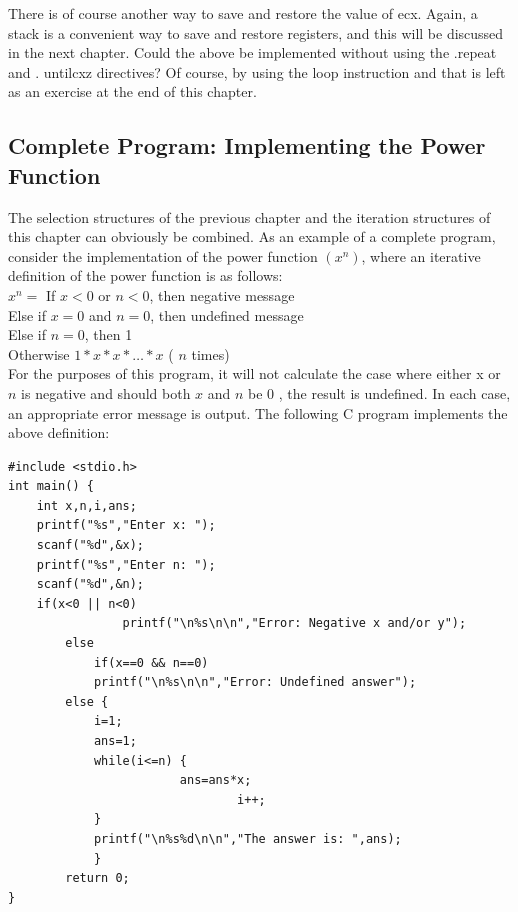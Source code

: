 \documentclass[10pt]{book}
\begin{document}
There is of course another way to save and restore the value of ecx. Again, a stack is a convenient way to save and restore registers, and this will be discussed in the next chapter. Could the above be implemented without using the .repeat and . untilcxz directives? Of course, by using the loop instruction and that is left as an exercise at the end of this chapter.

\subsection{Complete Program: Implementing the Power Function}
The selection structures of the previous chapter and the iteration structures of this chapter can obviously be combined. As an example of a complete program, consider the implementation of the power function $\left(x^{n}\right)$, where an iterative definition of the power function is as follows:\\
$x^{n}=$ If $x<0$ or $n<0$, then negative message\\
Else if $x=0$ and $n=0$, then undefined message\\
Else if $n=0$, then 1\\
Otherwise $1 * x * x * \ldots * x$ ( $n$ times)\\
For the purposes of this program, it will not calculate the case where either x or $n$ is negative and should both $x$ and $n$ be 0 , the result is undefined. In each case, an appropriate error message is output. The following C program implements the above definition:

\begin{verbatim}
#include <stdio.h>
int main() {
    int x,n,i,ans;
    printf("%s","Enter x: ");
    scanf("%d",&x);
    printf("%s","Enter n: ");
    scanf("%d",&n);
    if(x<0 || n<0)
                printf("\n%s\n\n","Error: Negative x and/or y");
        else
            if(x==0 && n==0)
            printf("\n%s\n\n","Error: Undefined answer");
        else {
            i=1;
            ans=1;
            while(i<=n) {
                        ans=ans*x;
                                i++;
            }
            printf("\n%s%d\n\n","The answer is: ",ans);
            }
        return 0;
}
\end{verbatim}
\end{document}
